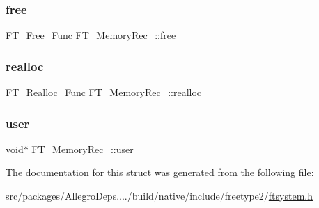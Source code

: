 \subsubsection{\texorpdfstring{free}{free}}
{\footnotesize\ttfamily \hyperlink{ftsystem_8h_abbf66b34e6c3a7f9564cbe3d6fa6c6fb}{F\+T\+\_\+\+Free\+\_\+\+Func} F\+T\+\_\+\+Memory\+Rec\+\_\+\+::free}

\mbox{\label{struct_f_t___memory_rec___a5ce3424cc72e898fe973ffeabe44a95c}} 
\subsubsection{\texorpdfstring{realloc}{realloc}}
{\footnotesize\ttfamily \hyperlink{ftsystem_8h_a264ca9013613b2454d64987bf768ac93}{F\+T\+\_\+\+Realloc\+\_\+\+Func} F\+T\+\_\+\+Memory\+Rec\+\_\+\+::realloc}

\mbox{\label{struct_f_t___memory_rec___aae5bc614434ba4525e37d7faaf03c4b7}} 
\subsubsection{\texorpdfstring{user}{user}}
{\footnotesize\ttfamily \hyperlink{png_8h_ac9c84fa68bbad002983e35ce3663c686}{void}$\ast$ F\+T\+\_\+\+Memory\+Rec\+\_\+\+::user}



The documentation for this struct was generated from the following file\+:\begin{DoxyCompactItemize}
\item 
src/packages/\+Allegro\+Deps..../build/native/include/freetype2/\hyperlink{ftsystem_8h}{ftsystem.\+h}\end{DoxyCompactItemize}
